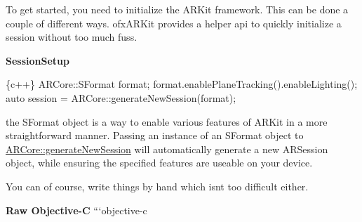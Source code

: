 To get started, you need to initialize the A\+R\+Kit framework. This can be done a couple of different ways. ofx\+A\+R\+Kit provides a helper api to quickly initialize a session without too much fuss.

{\bfseries Session\+Setup} 
\begin{DoxyCode}
\{c++\}
    ARCore::SFormat format;
    format.enablePlaneTracking().enableLighting();
    auto session = ARCore::generateNewSession(format);
\end{DoxyCode}


the {\ttfamily S\+Format} object is a way to enable various features of A\+R\+Kit in a more straightforward manner. Passing an instance of an {\ttfamily S\+Format} object to {\ttfamily \hyperlink{namespace_a_r_core_a66ae704f1eff4b085765cc73635db8eb}{A\+R\+Core\+::generate\+New\+Session}} will automatically generate a new {\ttfamily A\+R\+Session} object, while ensuring the specified features are useable on your device.

You can of course, write things by hand which isn\textquotesingle{}t too difficult either.

{\bfseries Raw Objective-\/C} ```objective-\/c 